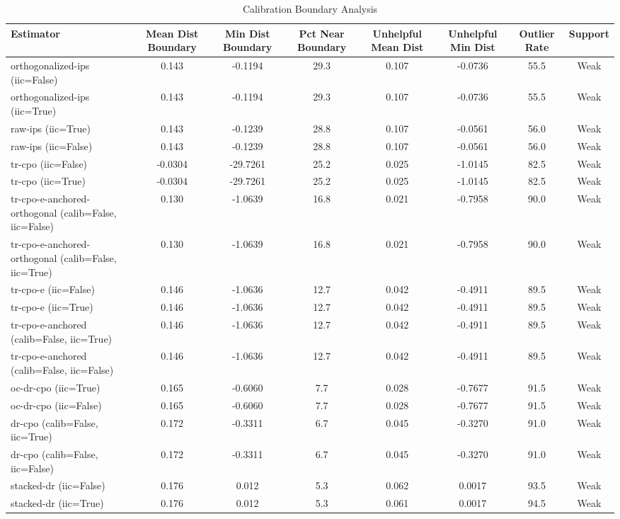 \begin{table}[htbp]
\centering
\caption{Calibration Boundary Analysis}
\label{tab:A5}
\begin{tabular}{l|ccccccc}
\toprule
Estimator & Mean Dist Boundary & Min Dist Boundary & Pct Near Boundary & Unhelpful Mean Dist & Unhelpful Min Dist & Outlier Rate & Support \\
\midrule
orthogonalized-ips (iic=False) & 0.143 & -0.1194 & 29.3 & 0.107 & -0.0736 & 55.5 & Weak \\
orthogonalized-ips (iic=True) & 0.143 & -0.1194 & 29.3 & 0.107 & -0.0736 & 55.5 & Weak \\
raw-ips (iic=True) & 0.143 & -0.1239 & 28.8 & 0.107 & -0.0561 & 56.0 & Weak \\
raw-ips (iic=False) & 0.143 & -0.1239 & 28.8 & 0.107 & -0.0561 & 56.0 & Weak \\
tr-cpo (iic=False) & -0.0304 & -29.7261 & 25.2 & 0.025 & -1.0145 & 82.5 & Weak \\
tr-cpo (iic=True) & -0.0304 & -29.7261 & 25.2 & 0.025 & -1.0145 & 82.5 & Weak \\
tr-cpo-e-anchored-orthogonal (calib=False, iic=False) & 0.130 & -1.0639 & 16.8 & 0.021 & -0.7958 & 90.0 & Weak \\
tr-cpo-e-anchored-orthogonal (calib=False, iic=True) & 0.130 & -1.0639 & 16.8 & 0.021 & -0.7958 & 90.0 & Weak \\
tr-cpo-e (iic=False) & 0.146 & -1.0636 & 12.7 & 0.042 & -0.4911 & 89.5 & Weak \\
tr-cpo-e (iic=True) & 0.146 & -1.0636 & 12.7 & 0.042 & -0.4911 & 89.5 & Weak \\
tr-cpo-e-anchored (calib=False, iic=True) & 0.146 & -1.0636 & 12.7 & 0.042 & -0.4911 & 89.5 & Weak \\
tr-cpo-e-anchored (calib=False, iic=False) & 0.146 & -1.0636 & 12.7 & 0.042 & -0.4911 & 89.5 & Weak \\
oc-dr-cpo (iic=True) & 0.165 & -0.6060 & 7.7 & 0.028 & -0.7677 & 91.5 & Weak \\
oc-dr-cpo (iic=False) & 0.165 & -0.6060 & 7.7 & 0.028 & -0.7677 & 91.5 & Weak \\
dr-cpo (calib=False, iic=True) & 0.172 & -0.3311 & 6.7 & 0.045 & -0.3270 & 91.0 & Weak \\
dr-cpo (calib=False, iic=False) & 0.172 & -0.3311 & 6.7 & 0.045 & -0.3270 & 91.0 & Weak \\
stacked-dr (iic=False) & 0.176 & 0.012 & 5.3 & 0.062 & 0.0017 & 93.5 & Weak \\
stacked-dr (iic=True) & 0.176 & 0.012 & 5.3 & 0.061 & 0.0017 & 94.5 & Weak \\

\end{tabular}
\end{table}
